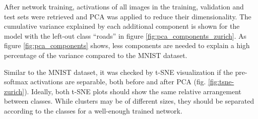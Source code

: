 \documentclass[10pt]{article}
\begin{document}
After network training, activations of all images in the training, validation and test sets were retrieved and \gls{PCA} was applied to reduce their dimensionality. The cumulative variance explained by each additional component is shown for the model with the left-out class ``roads'' in figure \ref{fig:pca_components_zurich}. As figure \ref{fig:pca_components} shows, less components are needed to explain a high percentage of the variance compared to the \gls{MNIST} dataset. 

Similar to the \gls{MNIST} dataset, it was checked by \gls{t-SNE} visualization if the pre-softmax activations are separable, both before and after \gls{PCA} (fig. \ref{fig:tsne-zurich}). Ideally, both t-SNE plots should show the same relative arrangement between classes. While clusters may be of different sizes, they should be separated according to the classes for a well-enough trained network.
\end{document}
